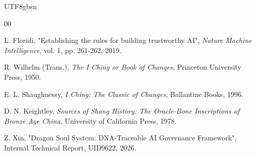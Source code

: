 \documentclass[conference]{IEEEtran}
\begin{document}
\begin{CJK}{UTF8}{gbsn}
\begin{thebibliography}{00}

 L. Floridi, "Establishing the rules for building trustworthy AI", \textit{Nature Machine Intelligence}, vol. 1, pp. 261-262, 2019.

 R. Wilhelm (Trans.), \textit{The I Ching or Book of Changes}, Princeton University Press, 1950.

 E. L. Shaughnessy, \textit{I Ching: The Classic of Changes}, Ballantine Books, 1996.

 D. N. Keightley, \textit{Sources of Shang History: The Oracle-Bone Inscriptions of Bronze Age China}, University of California Press, 1978.

 Z. Xin, "Dragon Soul System: DNA-Traceable AI Governance Framework", Internal Technical Report, UID9622, 2026.

\end{thebibliography}

\end{CJK}
\end{document}
